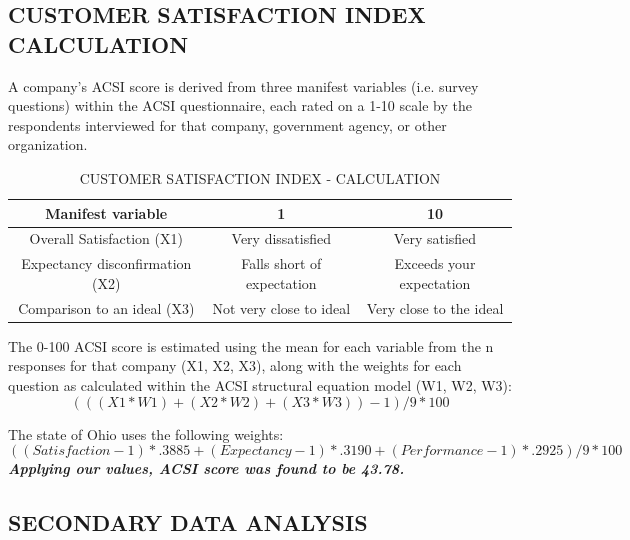 \documentclass[a4paper, 12pt]{extarticle}
\begin{document}
{\subsection{CUSTOMER SATISFACTION INDEX CALCULATION}
A company's ACSI score is derived from three manifest variables (i.e. survey questions) within the ACSI questionnaire, each rated on a 1-10 scale by the respondents interviewed for that company, government agency, or other organization.

\begin{table}[H]
\centering
\begin{tabular}{|c|c|c|}
\hline
\textbf{Manifest variable} & 1 & 10 \\
\hline
Overall Satisfaction (X1) & Very dissatisfied & Very satisfied \\
\hline
Expectancy disconfirmation (X2) & Falls short of expectation & Exceeds your expectation \\
\hline
Comparison to an ideal (X3) & Not very close to ideal & Very close to the ideal\\
\hline
\end{tabular}
\caption{CUSTOMER SATISFACTION INDEX - CALCULATION}
\end{table}
The 0-100 ACSI score is estimated using the mean for each variable from the n responses for that company (X1, X2, X3), along with the weights for each question as calculated within the ACSI structural equation model (W1, W2, W3):\\ 
\[ (((X1*W1)+(X2*W2)+(X3*W3))-1)/9*100 \]
\par The state of Ohio uses the following weights: \\
\[ ((Satisfaction-1)*.3885 + (Expectancy-1)*.3190 + (Performance-1)*.2925) / 9 * 100 \]
\textbf{\emph{Applying our values, ACSI score was found to be 43.78.}}

\subsection{SECONDARY DATA ANALYSIS}
}
\end{document}
